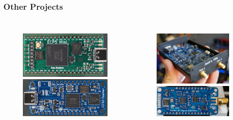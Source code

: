 \documentclass[aspectratio=169, t]{beamer}
\begin{document}
\begin{frame}
\frametitle{Other Projects}
\vspace{-5mm}
\begin{columns}
	\begin{figure}
		\includegraphics[width=0.95\linewidth]{images/ecp5-front.JPG}
		\includegraphics[width=0.95\linewidth]{images/ice40.JPG}
	\end{figure}

	\begin{figure}
		\includegraphics[width=0.825\linewidth]{images/vna.jpg}
		\includegraphics[width=0.825\linewidth]{images/rf-sig-gen.jpg}
	\end{figure}
\end{columns}
\end{frame}
\end{document}
